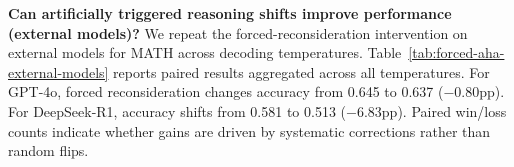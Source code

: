 \noindent
\textbf{Can artificially triggered reasoning shifts improve performance (external models)?}
We repeat the forced-reconsideration intervention on external models for \textsc{MATH} across decoding temperatures. Table~\ref{tab:forced-aha-external-models} reports paired results aggregated across all temperatures. For GPT-4o, forced reconsideration changes accuracy from 0.645 to 0.637 ($-0.80$pp). For DeepSeek-R1, accuracy shifts from 0.581 to 0.513 ($-6.83$pp). Paired win/loss counts indicate whether gains are driven by systematic corrections rather than random flips.

